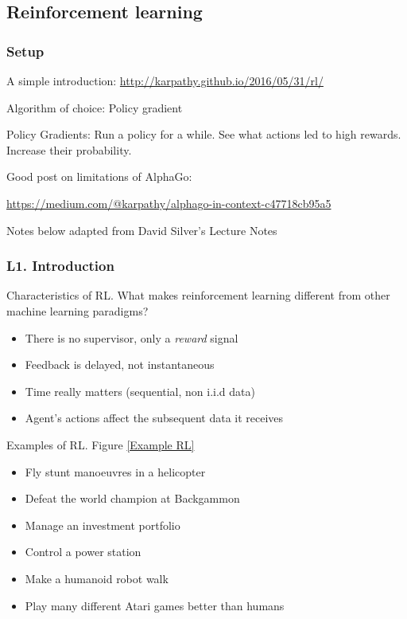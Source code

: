 \documentclass[english]{article}
\begin{document}
\eenum


\subsection{Reinforcement learning}
\subsubsection{Setup}
\benum
\item A simple introduction: 
\url{http://karpathy.github.io/2016/05/31/rl/}
\item Algorithm of choice: Policy gradient

Policy Gradients: Run a policy for a while. See what actions led to high rewards. Increase their probability.


\item Good post on limitations of AlphaGo: 

\url{https://medium.com/@karpathy/alphago-in-context-c47718cb95a5}


\item Notes below adapted from David Silver's Lecture Notes
\eenum 



\subsubsection{L1. Introduction}
\benum 

\item {Characteristics of RL}.
What makes reinforcement learning different from other machine
learning paradigms?
\begin{itemize}
    \item There is no supervisor, only a \textit{reward} signal
    \item Feedback is delayed, not instantaneous
    \item Time really matters (sequential, non i.i.d data)
    \item Agent's actions affect the subsequent data it receives
\end{itemize}



\item {Examples of RL}. Figure \ref{Example RL}
\begin{itemize}
    \item Fly stunt manoeuvres in a helicopter
    \item Defeat the world champion at Backgammon
    \item Manage an investment portfolio
    \item Control a power station
    \item Make a humanoid robot walk
    \item Play many different Atari games better than humans
\end{itemize}
\end{document}
